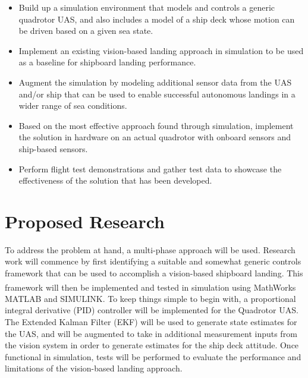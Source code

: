 \documentclass[12pt, letterpaper]{article}
\begin{document}
\begin{itemize}

	\item Build up a simulation environment that models and controls a generic quadrotor UAS, and also includes a model of a ship deck whose motion can be driven based on a given sea state.

	\item Implement an existing vision-based landing approach in simulation to be used as a baseline for shipboard landing performance.  

	\item Augment the simulation by modeling additional sensor data from the UAS and/or ship that can be used to enable successful autonomous landings in a wider range of sea conditions.

	\item Based on the most effective approach found through simulation, implement the solution in hardware on an actual quadrotor with onboard sensors and ship-based sensors.
	
	\item Perform flight test demonstrations and gather test data to showcase the effectiveness of the solution that has been developed.

\end{itemize}

\section{Proposed Research}

To address the problem at hand, a multi-phase approach will be used.  Research work will commence by first identifying a suitable and somewhat generic controls framework that can be used to accomplish a vision-based shipboard landing.  This framework will then be implemented and tested in simulation using MathWorks\textsuperscript{\textregistered} MATLAB and SIMULINK.  To keep things simple to begin with, a proportional integral derivative (PID) controller will be implemented for the Quadrotor UAS.  The Extended Kalman Filter (EKF) will be used to generate state estimates for the UAS, and will be augmented to take in additional measurement inputs from the vision system in order to generate estimates for the ship deck attitude.  Once functional in simulation, tests will be performed to evaluate the performance and limitations of the vision-based landing approach. 
\end{document}
